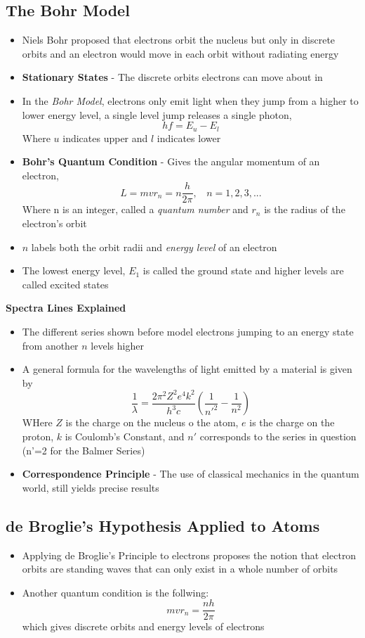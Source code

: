 \subsection{The Bohr Model}
\begin{itemize}
    \item Niels Bohr proposed that electrons orbit the nucleus but only in discrete orbits and an electron would move in each orbit without radiating energy
    \item \textbf{Stationary States} - The discrete orbits electrons can move about in
    \item In the \emph{Bohr Model}, electrons only emit light when they jump from a higher to lower energy level, a single level jump releases a single photon, \[hf=E_u-E_l\] Where \(u\) indicates upper and \(l\) indicates lower
    \item \textbf{Bohr's Quantum Condition} - Gives the angular momentum of an electron, \[L=mvr_n=n\frac{h}{2\pi},\ \ \ \ n=1,2,3,...\] Where n is an integer, called a \emph{quantum number} and \(r_n\) is the radius of the electron's orbit
    \item \(n\) labels both the orbit radii and \emph{energy level} of an electron
    \item The lowest energy level, \(E_1\) is called the ground state and higher levels are called excited states
\end{itemize}

\textbf{Spectra Lines Explained}
\begin{itemize}
    \item The different series shown before model electrons jumping to an energy state from another \(n\) levels higher
    \item A general formula for the wavelengths of light emitted by a material is given by \[\frac{1}{\lambda}=\frac{2\pi^2Z^2e^4k^2}{h^3c}(\frac{1}{n'^2}-\frac{1}{n^2})\] WHere \(Z\) is the charge on the nucleus o the atom, \(e\) is the charge on the proton, \(k\) is Coulomb's Constant, and \(n'\) corresponds to the series in question (n'=2 for the Balmer Series)
    \item \textbf{Correspondence Principle} - The use of classical mechanics in the quantum world, still yields precise results
\end{itemize}

\subsection{de Broglie's Hypothesis Applied to Atoms}
\begin{itemize}
    \item Applying de Broglie's Principle to electrons proposes the notion that electron orbits are standing waves that can only exist in a whole number of orbits
    \item Another quantum condition is the follwing: \[mvr_n=\frac{nh}{2\pi}\] which gives discrete orbits and energy levels of electrons
\end{itemize}

\newpage
